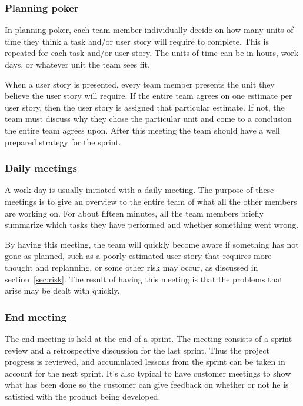 \subsubsection{Planning poker}
In planning poker, each team member individually decide on how many units of time they think a task and/or user story will require to complete. This is repeated for each task and/or user story. The units of time can be in hours, work days, or whatever unit the team sees fit.

When a user story is presented, every team member presents the unit they believe the user story will require. If the entire team agrees on one estimate per user story, then the user story is assigned that particular estimate. If not, the team must discuss why they chose the particular unit and come to a conclusion the entire team agrees upon.
After this meeting the team should have a well prepared strategy for the sprint.

\subsubsection{Daily meetings}
A work day is usually initiated with a daily meeting. The purpose of these meetings is to give an overview to the entire team of what all the other members are working on. For about fifteen minutes, all the team members briefly summarize which tasks they have performed and whether something went wrong.

By having this meeting, the team will quickly become aware if something has not gone as planned, such as a poorly estimated user story that requires more thought and replanning, or some other risk may occur, as discussed in section~\ref{sec:risk}. The result of having this meeting is that the problems that arise may be dealt with quickly.

\subsubsection{End meeting}
The end meeting is held at the end of a sprint. The meeting consists of a sprint review and a retrospective discussion for the last sprint.
Thus the project progress is reviewed, and accumulated lessons from the sprint can be taken in account for the next sprint.
It's also typical to have customer meetings to show what has been done so the customer can give feedback on whether or not he is satisfied with the product being developed.

